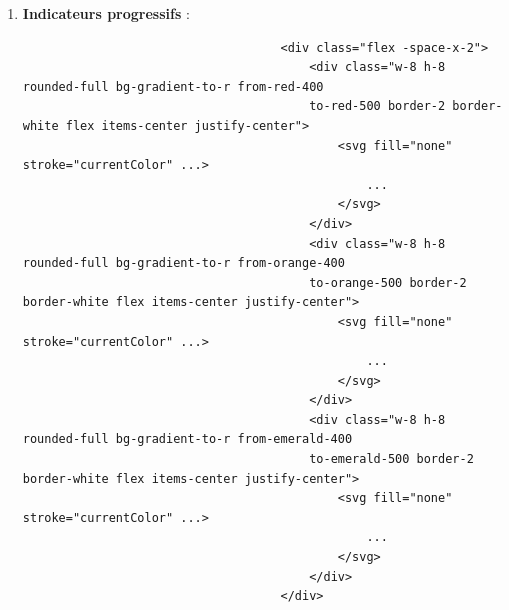 \documentclass[a4paper,11pt]{article}
\begin{document}
\begin{enumerate}
                        \item \textbf{Indicateurs progressifs} :
                            \begin{tcolorbox}[colback=lightgray!5, colframe=gray!80, left=-70mm, right=5mm, top=2mm, bottom=0mm, boxrule=0.1mm]
                                \begin{verbatim}
                                    <div class="flex -space-x-2">
                                        <div class="w-8 h-8 rounded-full bg-gradient-to-r from-red-400 
                                        to-red-500 border-2 border-white flex items-center justify-center">
                                            <svg fill="none" stroke="currentColor" ...>
                                                ...
                                            </svg>
                                        </div>
                                        <div class="w-8 h-8 rounded-full bg-gradient-to-r from-orange-400 
                                        to-orange-500 border-2 border-white flex items-center justify-center">
                                            <svg fill="none" stroke="currentColor" ...>
                                                ...
                                            </svg>
                                        </div>
                                        <div class="w-8 h-8 rounded-full bg-gradient-to-r from-emerald-400 
                                        to-emerald-500 border-2 border-white flex items-center justify-center">
                                            <svg fill="none" stroke="currentColor" ...>
                                                ...
                                            </svg>
                                        </div>
                                    </div>
                                \end{verbatim}
                            \end{tcolorbox}


\end{enumerate}
\end{document}
